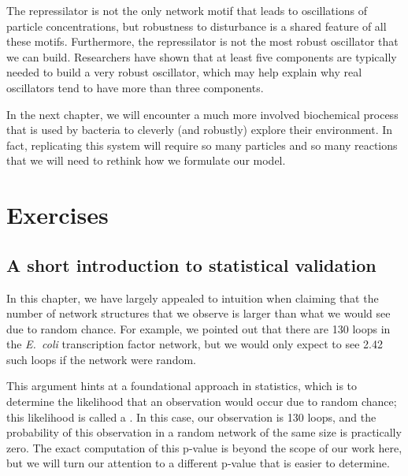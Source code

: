The repressilator is not the only network motif that leads to oscillations of particle concentrations, but robustness to disturbance is a shared feature of all these motifs. Furthermore, the repressilator is not the most robust oscillator that we can build. Researchers have shown that at least five components are typically needed to build a very robust oscillator, which may help explain why real oscillators tend to have more than three components.


In the next chapter, we will encounter a much more involved biochemical process that is used by bacteria to cleverly (and robustly) explore their environment. In fact, replicating this system will require so many particles and so many reactions that we will need to rethink how we formulate our model.\\

\newpage

\FloatBarrier
\section{Exercises}
\label{sec:exercises}

\subsection{A short introduction to statistical validation}

In this chapter, we have largely appealed to intuition when claiming that the number of network structures that we observe is larger than what we would see due to random chance. For example, we pointed out that there are 130 loops in the \textit{E.~coli} transcription factor network, but we would only expect to see 2.42 such loops if the network were random.

This argument hints at a foundational approach in statistics, which is to determine the likelihood that an observation would occur due to random chance; this likelihood is called a . In this case, our observation is 130 loops, and the probability of this observation in a random network of the same size is practically zero. The exact computation of this p-value is beyond the scope of our work here, but we will turn our attention to a different p-value that is easier to determine.

